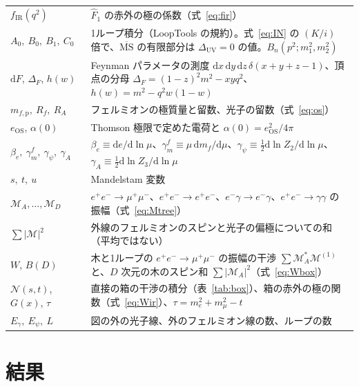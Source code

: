 \documentclass[a4paper,10pt]{ltjsarticle}
\newcommand{\dd}{\mathrm{d}}
\newcommand{\MSbar}{\overline{\mathrm{MS}}}
\newcommand{\DUV}{\Delta_{\mathrm{UV}}}
\begin{document}
\begin{table}[tbp]
\begin{tabularx}{\linewidth}{>{\raggedright\arraybackslash}p{3.7cm}X}
$f_{\mathrm{IR}}(q^2)$ & $\hat F_1$ の赤外の極の係数（式~\eqref{eq:fir}） \\
$A_0,\ B_0,\ B_1,\ C_0$ & 1ループ積分（LoopTools の規約）。式~\eqref{eq:IN} の $(K/i)$ 倍で、$\MSbar$ の有限部分は $\DUV=0$ の値。$B_n(p^2;m_1^2,m_2^2)$ \\
$\dd F$, $\Delta_F$, $h(w)$ & Feynman パラメータの測度 $\dd x\,\dd y\,\dd z\,\delta(x+y+z-1)$、頂点の分母 $\Delta_F=(1-z)^2m^2-xyq^2$、$h(w)=m^2-q^2w(1-w)$ \\
$m_{f,\mathrm p},\ R_f,\ R_A$ & フェルミオンの極質量と留数、光子の留数（式~\eqref{eq:os}） \\
$e_{\mathrm{OS}}$, $\alpha(0)$ & Thomson 極限で定めた電荷と $\alpha(0)=e_{\mathrm{OS}}^2/4\pi$ \\
$\beta_e,\ \gamma_m^f,\ \gamma_\psi,\ \gamma_A$ & $\beta_e\equiv\dd e/\dd\ln\mu$、$\gamma_m^f\equiv\mu\,\dd m_f/\dd\mu$、$\gamma_\psi\equiv\frac12\dd\ln Z_2/\dd\ln\mu$、$\gamma_A\equiv\frac12\dd\ln Z_3/\dd\ln\mu$ \\
$s,\ t,\ u$ & Mandelstam 変数 \\
$\mathcal M_A,\dots,\mathcal M_D$ & $e^+e^-\to\mu^+\mu^-$、$e^+e^-\to e^+e^-$、$e^-\gamma\to e^-\gamma$、$e^+e^-\to\gamma\gamma$ の振幅（式~\eqref{eq:Mtree}） \\
$\sum|\mathcal M|^2$ & 外線のフェルミオンのスピンと光子の偏極についての和（平均ではない） \\
$W$, $B(D)$ & 木と1ループの $e^+e^-\to\mu^+\mu^-$ の振幅の干渉 $\sum\mathcal M_A^*\mathcal M^{(1)}$ と、$D$ 次元の木のスピン和 $\sum|\mathcal M_A|^2$（式~\eqref{eq:Wbox}） \\
$\mathcal N(s,t)$, $G(x)$, $\tau$ & 直接の箱の干渉の積分（表~\ref{tab:box}）、箱の赤外の極の関数（式~\eqref{eq:Wir}）、$\tau=m_e^2+m_\mu^2-t$ \\
$E_\gamma,\ E_\psi,\ L$ & 図の外の光子線、外のフェルミオン線の数、ループの数 \\
\bottomrule
\end{tabularx}
\end{table}

\section{結果}\label{sec:results}
\end{document}
